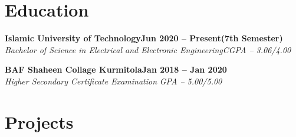 \documentclass[letterpaper,10pt]{article}
\newcommand{\heading}[2]{
  \hspace{10pt}#1\hfill#2\\
}
\newcommand{\headingBf}[2]{
  \heading{\textbf{#1}}{\textbf{#2}}
}
\newcommand{\headingIt}[2]{
  \heading{\textit{#1}}{\textit{#2}}
}
\newenvironment{resume_list}{
  \vspace{-7pt}
  \begin{itemize}[itemsep=-2px, parsep=1pt, leftmargin=30pt]
}{
  \end{itemize}
}
\begin{document}


  \section{Education}

  \headingBf{Islamic University of Technology}{\textbf{Jun 2020 -- Present(7th Semester)}} %
  \headingIt{Bachelor of Science in Electrical and Electronic Engineering}{CGPA -- 3.06/4.00}

  \vspace{3pt}

  \headingBf{BAF Shaheen Collage Kurmitola}{\textbf{Jan 2018 -- Jan 2020}} %
  \headingIt{Higher Secondary Certificate Examination }{GPA -- 5.00/5.00}


  \section{Projects}
\end{document}
